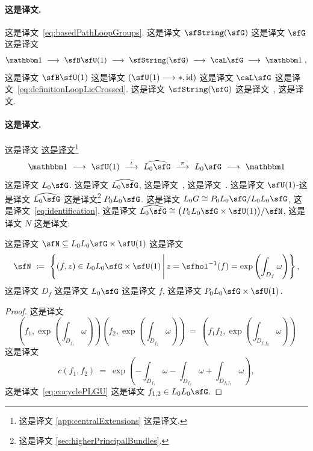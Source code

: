 \documentclass[
    affil-it, %
    auth-lg, %
    british, %
    compression, %
    contents, %
    custom-packages={}, %
    references={bigone}, %
]{lib/preprint}
\begin{document}
\begin{body}
        \paragraph{这是译文.}
 这是译文~\eqref{eq:basedPathLoopGroups}. 这是译文 $\sfString(\sfG)$ 这是译文 $\sfG$ 这是译文         \begin{equation}\label{eq:centralExtension2Groups}
            \unit\ \longrightarrow\ \sfB\sfU(1)\ \longrightarrow\ \sfString(\sfG)\ \longrightarrow\ \caL\sfG\ \longrightarrow\ \unit~,
        \end{equation}  这是译文 $\sfB\sfU(1)$ 这是译文 $(\sfU(1)\longrightarrow*,\id)$ 这是译文 $\caL\sfG$ 这是译文~\eqref{eq:definitionLoopLieCrossed}. 这是译文 $\sfString(\sfG)$ 这是译文~\cite{Baez:2005sn}, 这是译文.

        \paragraph{这是译文.}
这是译文 \uline{这是译文}\footnote{这是译文 \cref{app:centralExtensions} 这是译文.}
        \begin{equation}\label{eq:Kac-Moody-group-extension}
            \unit\ \longrightarrow\ \sfU(1)\ \overset{\iota}{\longrightarrow}\ \widehat{L_0\sfG}\ \overset{\pi}{\longrightarrow}\ L_0\sfG\ \longrightarrow\ \unit
        \end{equation}  这是译文 $L_0\sfG$. 这是译文 $\widehat{L_0\sfG}$, 这是译文~\cite{Murray:1987ua}, 这是译文~\cite{Mickelsson:1987:173-183,Murray:2001eu}. 这是译文 $\sfU(1)$-这是译文 $\widehat{L_0\sfG}$ 这是译文\footnote{这是译文 \cref{sec:higherPrincipalBundles}.} $P_0L_0\sfG$. 这是译文 $L_0G\cong P_0L_0\sfG/L_0L_0\sfG$, 这是译文~\eqref{eq:identification}, 这是译文 $\widehat{L_0\sfG}\cong \big(P_0L_0\sfG\times\sfU(1)\big)/\sfN$, 这是译文 $N$ 这是译文: 
        
        \begin{proposition}
            这是译文 $\sfN\subseteq L_0L_0\sfG\times\sfU(1)$ 这是译文             \begin{equation}\label{eq:subgroupN}
                \sfN\ \coloneqq\ \left\{(f,z)\in L_0L_0\sfG\times\sfU(1)\,\middle|\,z=\sfhol^{-1}(f)=\exp\left(\int_{D_f}\omega\right)\right\},
            \end{equation}  这是译文 $D_f$ 这是译文 $L_0\sfG$ 这是译文 $f$, 这是译文 $P_0L_0\sfG\times\sfU(1)$.
        \end{proposition}

        \begin{proof}
            这是译文             \begin{equation}
                \left(f_1,\exp\left(\int_{D_{f_1}}\omega\right)\right)\left(f_2,\exp\left(\int_{D_{f_2}}\omega\right)\right)\ =\ \left(f_1f_2,\exp\left(\int_{D_{f_1f_2}}\omega\right)\right)
            \end{equation}  这是译文 
            \begin{equation}
                c(f_1,f_2)\ =\ \exp\left(-\int_{D_{f_1}}\omega-\int_{D_{f_2}}\omega+\int_{D_{f_1f_2}}\omega\right),
            \end{equation}  这是译文~\eqref{eq:cocyclePLGU} 这是译文 $f_{1,2}\in L_0L_0\sfG$. 


\end{proof}
\end{body}
\end{document}
